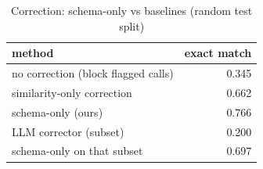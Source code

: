 \begin{table}[t]
\centering
\caption{Correction: schema-only vs baselines (random test split)}
\label{tab:baselines_correction_random}
\begin{tabular}{lr}
\hline
method & exact match \\
\hline
no correction (block flagged calls) & 0.345 \\
similarity-only correction & 0.662 \\
schema-only (ours) & 0.766 \\
LLM corrector (subset) & 0.200 \\
schema-only on that subset & 0.697 \\
\hline
\end{tabular}
\end{table}
